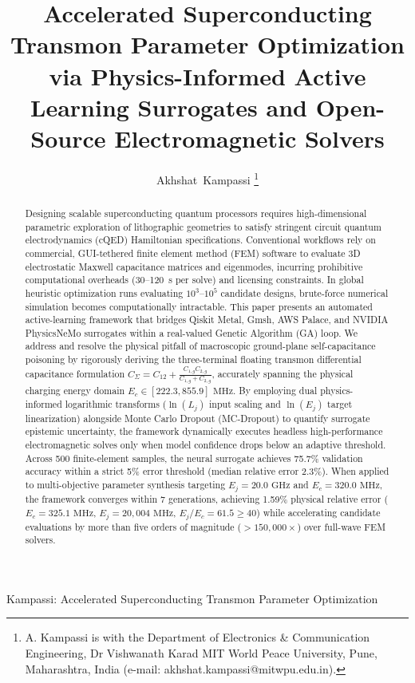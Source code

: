 \documentclass[journal,10pt,twocolumn]{IEEEtran}
\begin{document}
\title{Accelerated Superconducting Transmon Parameter Optimization via Physics-Informed Active Learning Surrogates and Open-Source Electromagnetic Solvers}

\author{Akhshat~Kampassi%
\thanks{A. Kampassi is with the Department of Electronics \& Communication Engineering, Dr Vishwanath Karad MIT World Peace University, Pune, Maharashtra, India (e-mail: akhshat.kampassi@mitwpu.edu.in).}}

%
{Kampassi: Accelerated Superconducting Transmon Parameter Optimization}

\maketitle

\begin{abstract}
Designing scalable superconducting quantum processors requires high-dimensional parametric exploration of lithographic geometries to satisfy stringent circuit quantum electrodynamics (cQED) Hamiltonian specifications. Conventional workflows rely on commercial, GUI-tethered finite element method (FEM) software to evaluate 3D electrostatic Maxwell capacitance matrices and eigenmodes, incurring prohibitive computational overheads (30--120~s per solve) and licensing constraints. In global heuristic optimization runs evaluating $10^3\text{--}10^5$ candidate designs, brute-force numerical simulation becomes computationally intractable. This paper presents an automated active-learning framework that bridges Qiskit Metal, Gmsh, AWS Palace, and NVIDIA PhysicsNeMo surrogates within a real-valued Genetic Algorithm (GA) loop. We address and resolve the physical pitfall of macroscopic ground-plane self-capacitance poisoning by rigorously deriving the three-terminal floating transmon differential capacitance formulation $C_\Sigma = C_{12} + \frac{C_{1,g} C_{2,g}}{C_{1,g} + C_{2,g}}$, accurately spanning the physical charging energy domain $E_c \in [222.3, 855.9]\text{ MHz}$. By employing dual physics-informed logarithmic transforms ($\ln(L_j)$ input scaling and $\ln(E_j)$ target linearization) alongside Monte Carlo Dropout (MC-Dropout) to quantify surrogate epistemic uncertainty, the framework dynamically executes headless high-performance electromagnetic solves only when model confidence drops below an adaptive threshold. Across 500 finite-element samples, the neural surrogate achieves 75.7\% validation accuracy within a strict 5\% error threshold (median relative error 2.3\%). When applied to multi-objective parameter synthesis targeting $E_j = 20.0\text{ GHz}$ and $E_c = 320.0\text{ MHz}$, the framework converges within 7 generations, achieving 1.59\% physical relative error ($E_c = 325.1\text{ MHz}$, $E_j = 20,004\text{ MHz}$, $E_j / E_c = 61.5 \ge 40$) while accelerating candidate evaluations by more than five orders of magnitude ($> 150,000\times$) over full-wave FEM solvers.
\end{abstract}
\end{document}
